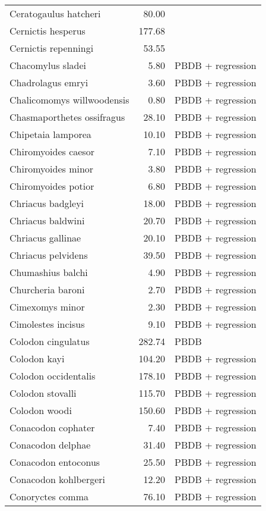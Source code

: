 \begin{table}[ht]
\begin{tabular}{lrl}
  Ceratogaulus hatcheri & 80.00 & \cite{Cassiliano2008} \\ 
  Cernictis hesperus & 177.68 & \cite{Tomiya2013} \\ 
  Cernictis repenningi & 53.55 & \cite{Hall1930} \\ 
  Chacomylus sladei & 5.80 & PBDB + regression \\ 
  Chadrolagus emryi & 3.60 & PBDB + regression \\ 
  Chalicomomys willwoodensis & 0.80 & PBDB + regression \\ 
  Chasmaporthetes ossifragus & 28.10 & PBDB + regression \\ 
  Chipetaia lamporea & 10.10 & PBDB + regression \\ 
  Chiromyoides caesor & 7.10 & PBDB + regression \\ 
  Chiromyoides minor & 3.80 & PBDB + regression \\ 
  Chiromyoides potior & 6.80 & PBDB + regression \\ 
  Chriacus badgleyi & 18.00 & PBDB + regression \\ 
  Chriacus baldwini & 20.70 & PBDB + regression \\ 
  Chriacus gallinae & 20.10 & PBDB + regression \\ 
  Chriacus pelvidens & 39.50 & PBDB + regression \\ 
  Chumashius balchi & 4.90 & PBDB + regression \\ 
  Churcheria baroni & 2.70 & PBDB + regression \\ 
  Cimexomys minor & 2.30 & PBDB + regression \\ 
  Cimolestes incisus & 9.10 & PBDB + regression \\ 
  Colodon cingulatus & 282.74 & PBDB \\ 
  Colodon kayi & 104.20 & PBDB + regression \\ 
  Colodon occidentalis & 178.10 & PBDB + regression \\ 
  Colodon stovalli & 115.70 & PBDB + regression \\ 
  Colodon woodi & 150.60 & PBDB + regression \\ 
  Conacodon cophater & 7.40 & PBDB + regression \\ 
  Conacodon delphae & 31.40 & PBDB + regression \\ 
  Conacodon entoconus & 25.50 & PBDB + regression \\ 
  Conacodon kohlbergeri & 12.20 & PBDB + regression \\ 
  Conoryctes comma & 76.10 & PBDB + regression \\ 

\end{tabular}
\end{table}
